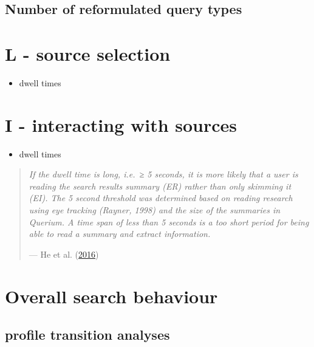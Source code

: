 \documentclass[letterpaper, nobind]{templates/ociamthesis}
\providecommand{\tightlist}{%
  \setlength{\itemsep}{0pt}\setlength{\parskip}{0pt}}
\begin{document}
\hypertarget{number-of-reformulated-query-types}{%
\subsection{Number of reformulated query types}\label{number-of-reformulated-query-types}}

\hypertarget{l---source-selection}{%
\section{L - source selection}\label{l---source-selection}}

\begin{itemize}
\tightlist
\item
  dwell times
\end{itemize}

\hypertarget{i---interacting-with-sources}{%
\section{I - interacting with sources}\label{i---interacting-with-sources}}

\begin{itemize}
\tightlist
\item
  dwell times
\end{itemize}

\begin{quote}
\emph{If the dwell time is long, i.e.~≥ 5 seconds, it is more likely that a user is reading the search results summary (ER) rather than only skimming it (EI). The 5 second threshold was determined based on reading research using eye tracking (Rayner, 1998) and the size of the summaries in Querium. A time span of less than 5 seconds is a too short period for being able to read a summary and extract information.}

\hfill --- He et al. (\protect\hyperlink{ref-he2016beyond}{2016})
\end{quote}

\hypertarget{overall-search-behaviour}{%
\section{Overall search behaviour}\label{overall-search-behaviour}}

\hypertarget{profile-transition-analyses}{%
\subsection{profile transition analyses}\label{profile-transition-analyses}}
\end{document}
